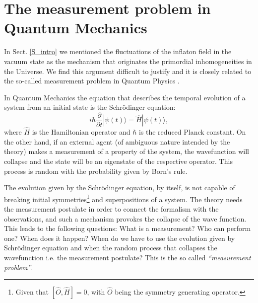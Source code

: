 \documentclass[baaa]{baaa}
\begin{document}

\section{The measurement problem in Quantum Mechanics}

In Sect. \ref{S_intro} we mentioned the fluctuations of the inflaton field in the vacuum state as the mechanism that originates the primordial inhomogeneities in the Universe. We find this argument difficult to justify and it is closely related to the so-called measurement problem in Quantum Physics \citep{Maudlin1995-MAUTMP, Okon2014, Norsen2017}. 

In Quantum Mechanics the equation that describes the temporal evolution of a system from an initial state is the Schrödinger equation: 
\begin{equation}
    i \hbar \frac{\partial}{\partial t} | \psi (t) \rangle = \hat{H} | \psi (t) \rangle ,
\end{equation}
where $\hat{H}$ is the Hamiltonian operator and $\hbar$ is the reduced Planck constant. On the other hand, if an external agent (of ambiguous nature intended by the theory) makes a measurement of a property of the system, the wavefunction will collapse and the state will be an eigenstate of the respective operator. This process is random with the probability given by Born’s rule.

The evolution given by the Schrödinger equation, by itself, is not capable of breaking initial symmetries\footnote{Given that $[\hat{O},\hat{H}]=0$, with $\hat{O}$ being the symmetry generating operator.} and superpositions of a system. The theory needs the measurement postulate in order to connect the formalism with the observations, and such a mechanism provokes the collapse of the wave function. This leads to the following questions: What is a measurement? Who can perform one? When does it happen? When do we have to use the evolution given by Schrödinger equation and when the random process that collapses the wavefunction i.e. the measurement postulate? This is the so called \textit{“measurement problem”}. 
\end{document}
